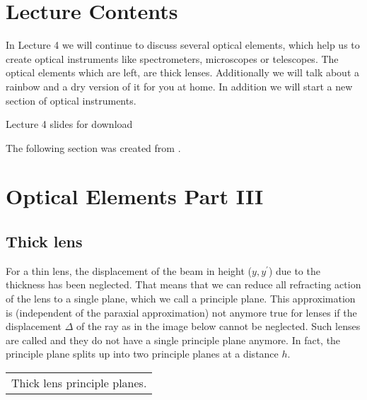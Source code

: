 \documentclass[letterpaper,10pt,english]{sphinxmanual}
\let\sphinxpxdimen\pdfpxdimen\else\newdimen\sphinxpxdimen
\begin{document}
\section{Lecture Contents}
\label{\detokenize{lectures/L4/overview_4:lecture-contents}}\label{\detokenize{lectures/L4/overview_4::doc}}
In Lecture 4 we will continue to discuss several optical elements, which help us to create optical instruments like spectrometers, microscopes or telescopes. The optical elements which are left, are thick lenses. Additionally we will talk about a rainbow and a dry version of it for you at home. In addition we will start a new section of optical instruments.

\noindent\sphinxincludegraphics[width=600\sphinxpxdimen]{{slides7}.png}

Lecture 4 slides for download 

The following section was created from .


\section{Optical Elements Part III}
\label{\detokenize{notebooks/L4/Optical Elements:Optical-Elements-Part-III}}\label{\detokenize{notebooks/L4/Optical Elements::doc}}

\subsection{Thick lens}
\label{\detokenize{notebooks/L4/Optical Elements:Thick-lens}}
For a thin lens, the displacement of the beam in height (\(y,y^{\prime}\)) due to the thickness has been neglected. That means that we can reduce all refracting action of the lens to a single plane, which we call a principle plane. This approximation is (independent of the paraxial approximation) not anymore true for lenses if the displacement \(\Delta\) of the ray as in the image below cannot be neglected. Such lenses are called  and they do not have a single principle
plane anymore. In fact, the principle plane splits up into two principle planes at a distance \(h\).


\begin{savenotes}\sphinxattablestart
\centering
\begin{tabulary}{\linewidth}[t]{|T|}
\hline
\sphinxstyletheadfamily 
{}
\\
\hline
{} Thick lens principle planes.
\\
\hline
\end{tabulary}
\par
\sphinxattableend\end{savenotes}
\end{document}
